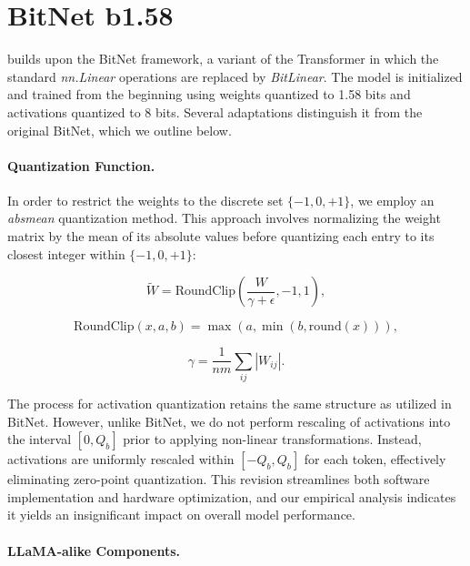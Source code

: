 \section{BitNet b1.58}

 builds upon the BitNet framework, a variant of the Transformer in which the standard \emph{nn.Linear} operations are replaced by \emph{BitLinear}. The model is initialized and trained from the beginning using weights quantized to 1.58 bits and activations quantized to 8 bits. Several adaptations distinguish it from the original BitNet, which we outline below.

\paragraph{Quantization Function.} In order to restrict the weights to the discrete set $\{-1, 0, +1\}$, we employ an \emph{absmean} quantization method. This approach involves normalizing the weight matrix by the mean of its absolute values before quantizing each entry to its closest integer within $\{-1, 0, +1\}$:

\begin{equation}
    \widetilde{W} = \mathrm{RoundClip}(\frac{W}{\gamma + \epsilon}, -1, 1),
\end{equation}

\begin{equation}
    \mathrm{RoundClip}(x, a, b) = \max(a, \min(b, \mathrm{round}(x))),
\end{equation}

\begin{equation}
    \gamma = \frac{1}{nm}\sum_{ij} |W_{ij}|.
\end{equation}

The process for activation quantization retains the same structure as utilized in BitNet. However, unlike BitNet, we do not perform rescaling of activations into the interval $[0, Q_b]$ prior to applying non-linear transformations. Instead, activations are uniformly rescaled within $[-Q_b, Q_b]$ for each token, effectively eliminating zero-point quantization. This revision streamlines both software implementation and hardware optimization, and our empirical analysis indicates it yields an insignificant impact on overall model performance.

\paragraph{LLaMA-alike Components.}

